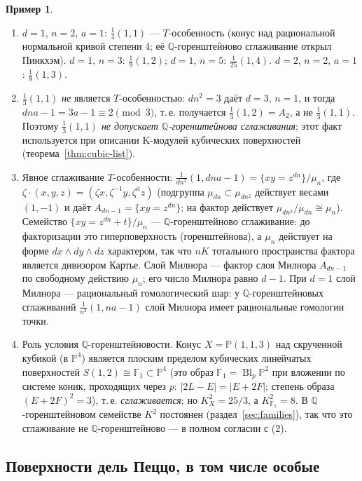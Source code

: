 \documentclass[11pt,a4paper]{article}
\theoremstyle{plain}
\theoremstyle{definition}
\newtheorem{example}[theorem]{Пример}
\theoremstyle{remark}
\newcommand{\Q}{\mathbb{Q}}
\newcommand{\PP}{\mathbb{P}}
\DeclareMathOperator{\Bl}{Bl}
\begin{document}
\begin{example}\label{ex:T-sing}
\begin{enumerate}
\item $d=1$, $n=2$, $a=1$: $\frac14(1,1)$ --- $T$-особенность (конус над рациональной нормальной
кривой степени 4; её $\Q$-горенштейново сглаживание открыл Пинкхэм). $d=1$, $n=3$: $\frac19(1,2)$;
$d=1$, $n=5$: $\frac1{25}(1,4)$. $d=2$, $n=2$, $a=1$: $\frac18(1,3)$.
\item $\frac13(1,1)$ \emph{не} является $T$-особенностью: $dn^2=3$ даёт $d=3$, $n=1$, и тогда
$dna-1=3a-1\equiv2\pmod3$, т.\,е. получается $\frac13(1,2)=A_2$, а не $\frac13(1,1)$. Поэтому
\emph{$\frac13(1,1)$ не допускает $\Q$-горенштейнова сглаживания}; этот факт используется при описании
K-модулей кубических поверхностей (теорема~\ref{thm:cubic-list}).
\item Явное сглаживание $T$-особенности: $\frac1{dn^2}(1,dna-1)=\{xy=z^{dn}\}/\mu_n$, где
$\zeta\cdot(x,y,z)=(\zeta x,\zeta^{-1}y,\zeta^az)$ (подгруппа $\mu_{dn}\subset\mu_{dn^2}$ действует
весами $(1,-1)$ и даёт $A_{dn-1}=\{xy=z^{dn}\}$; на фактор действует $\mu_{dn^2}/\mu_{dn}\cong\mu_n$).
Семейство $\{xy=z^{dn}+t\}/\mu_n$ --- $\Q$-горенштейново сглаживание: до факторизации это гиперповерхность
(горенштейнова), а $\mu_n$ действует на форме $dx\wedge dy\wedge dz$ характером, так что
$nK$ тотального пространства фактора является дивизором Картье. Слой Милнора --- фактор слоя Милнора $A_{dn-1}$
по свободному действию $\mu_n$; его число Милнора равно $d-1$. При $d=1$ слой Милнора --- рациональный
гомологический шар: у $\Q$-горенштейновых сглаживаний $\frac1{n^2}(1,na-1)$ слой Милнора имеет
рациональные гомологии точки.
\item Роль условия $\Q$-горенштейновости. Конус $X=\PP(1,1,3)$ над скрученной кубикой
(в $\PP^4$) является плоским пределом кубических линейчатых поверхностей $S(1,2)\cong\mathbb F_1\subset\PP^4$ (это образ
$\mathbb F_1=\Bl_p\PP^2$ при вложении по системе коник, проходящих через $p$:
$|2L-E|=|E+2F|$; степень образа $(E+2F)^2=3$), т.\,е.
\emph{сглаживается}; но $K_X^2=25/3$, а $K_{\mathbb F_1}^2=8$. В $\Q$-горенштейновом семействе
$K^2$ постоянен (раздел~\ref{sec:families}), так что это сглаживание не $\Q$-горенштейново ---
в полном согласии с (2).
\end{enumerate}
\end{example}

\subsection{Поверхности дель Пеццо, в том числе особые}\label{ss:dP}
\end{document}
